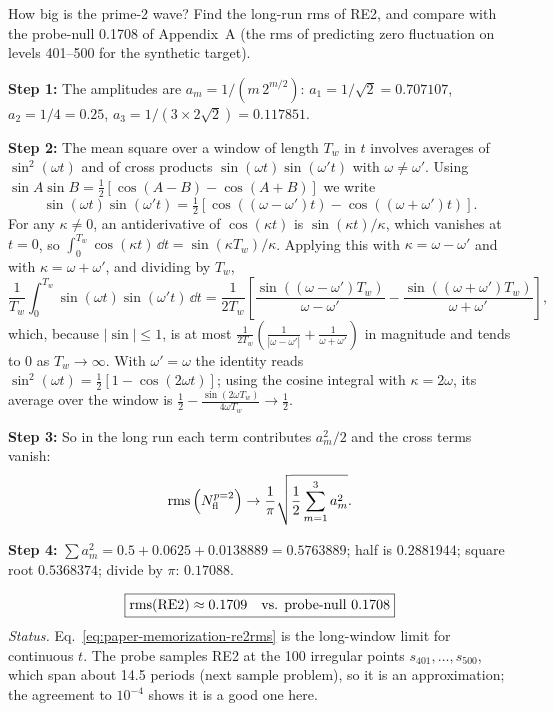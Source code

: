 \begin{sample}{How big is the prime-2 wave?}
Find the long-run rms of RE2, and compare with the probe-null 0.1708 of Appendix~A (the rms of predicting zero fluctuation on levels 401--500 for the synthetic target).

\textbf{Step 1:} The amplitudes are $a_m=1/(m\,2^{m/2})$: $a_1=1/\sqrt2=0.707107$, $a_2=1/4=0.25$, $a_3=1/(3\times2\sqrt2)=0.117851$.

\textbf{Step 2:} The mean square over a window of length $T_w$ in $t$ involves averages of $\sin^2(\omega t)$ and of cross products $\sin(\omega t)\sin(\omega' t)$ with $\omega\neq\omega'$. Using $\sin A\sin B=\tfrac12[\cos(A-B)-\cos(A+B)]$ we write
\[
\sin(\omega t)\sin(\omega' t)=\tfrac12\left[\cos((\omega-\omega')t)-\cos((\omega+\omega')t)\right].
\]
For any $\kappa\neq0$, an antiderivative of $\cos(\kappa t)$ is $\sin(\kappa t)/\kappa$, which vanishes at $t=0$, so $\int_0^{T_w}\cos(\kappa t)\,\dd t=\sin(\kappa T_w)/\kappa$. Applying this with $\kappa=\omega-\omega'$ and with $\kappa=\omega+\omega'$, and dividing by $T_w$,
\[
\frac1{T_w}\int_0^{T_w}\sin(\omega t)\sin(\omega' t)\,\dd t=\frac1{2T_w}\left[\frac{\sin((\omega-\omega')T_w)}{\omega-\omega'}-\frac{\sin((\omega+\omega')T_w)}{\omega+\omega'}\right],
\]
which, because $|\sin|\le1$, is at most $\frac1{2T_w}\left(\frac1{|\omega-\omega'|}+\frac1{\omega+\omega'}\right)$ in magnitude and tends to 0 as $T_w\to\infty$. With $\omega'=\omega$ the identity reads $\sin^2(\omega t)=\tfrac12[1-\cos(2\omega t)]$; using the cosine integral with $\kappa=2\omega$, its average over the window is $\frac12-\frac{\sin(2\omega T_w)}{4\omega T_w}\to\frac12$.

\textbf{Step 3:} So in the long run each term contributes $a_m^2/2$ and the cross terms vanish:
\begin{equation}
\mathrm{rms}\left(N^{p=2}_{\rm fl}\right)\to\frac1\pi\sqrt{\frac12\sum_{m=1}^3a_m^2}.
\label{eq:paper-memorization-re2rms}
\end{equation}

\textbf{Step 4:} $\sum a_m^2=0.5+0.0625+0.0138889=0.5763889$; half is $0.2881944$; square root $0.5368374$; divide by $\pi$: $0.17088$.

\[
\boxed{\mathrm{rms}(\text{RE2})\approx0.1709\quad\text{vs. probe-null }0.1708}
\]
\emph{Status.} Eq.~\eqref{eq:paper-memorization-re2rms} is the long-window limit for continuous $t$. The probe samples RE2 at the 100 irregular points $s_{401},\dots,s_{500}$, which span about 14.5 periods (next sample problem), so it is an approximation; the agreement to $10^{-4}$ shows it is a good one here.
\end{sample}

